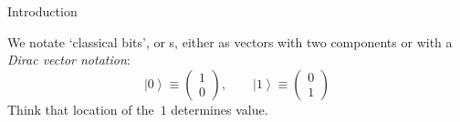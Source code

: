 
\def\dirac#1{\left|#1\right\rangle}

 {Introduction}

We notate `classical bits', or s, either as vectors
with two components or with a \emph{Dirac vector
  notation}:
\[
\dirac{0} \equiv
\begin{pmatrix}
  1\\0
\end{pmatrix},\qquad
\dirac{1} \equiv
\begin{pmatrix}
  0\\1
\end{pmatrix}
\]
Think that location of the~$1$ determines value.

